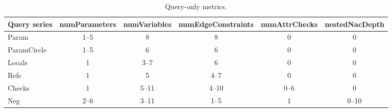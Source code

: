 \begin{table}[Htb]
	\centering
	\footnotesize
	\begin{tabular}{|l|c|c|c|c|c|}
	\hline 
	\textbf{Query series} & \textbf{numParameters} & \textbf{numVariables} &
	\textbf{numEdgeConstraints} & \textbf{numAttrChecks} &
	\textbf{nestedNacDepth}\\ \hline Param & \cellcolor{blue!25}1--5 & 8 & 8 & 0 & 0\\ \hline ParamCircle & \cellcolor{blue!25}1--5 & 6 & 6 & 0 & 0\\ \hline
	Locals & 1 & \cellcolor{blue!25}3--7 & 6 & 0 & 0\\ \hline
	Refs & 1 & 5 & \cellcolor{blue!25}4--7 & 0 & 0\\ \hline
	Checks & 1 & 5--11 & 4--10 & \cellcolor{blue!25}0--6 & 0\\ \hline
	Neg & 2--6 & 3--11 & 1--5 & 1 & \cellcolor{blue!25}0--10\\ \hline
	\end{tabular}
	\caption{Query-only metrics.}
	\label{tab:queryonlymetrics}
\end{table}
